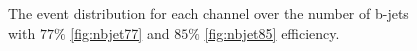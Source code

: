 \begin{figure}
    \caption{The event distribution for each channel over the number of b-jets 
    with $77\%$ \ref{fig:nbjet77} and $85\%$ \ref{fig:nbjet85} efficiency.}
    \label{fig:ATraining}
\end{figure}

